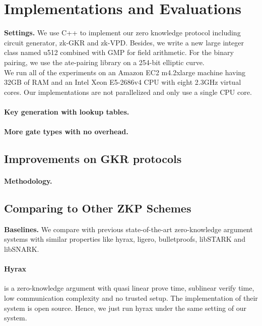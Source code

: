
\section{Implementations and Evaluations}\label{sec:eval}



\textbf{Settings.} We use C++ to implement our zero knowledge protocol including circuit generator, zk-GKR and zk-VPD. Besides, we write a new large integer class named u512 combined with GMP\cite{GNU} for field arithmetic. For the binary pairing, we use the ate-pairing\cite{ate-pairing} library on a 254-bit elliptic curve.\\
We run all of the experiments on an Amazon EC2 m4.2xlarge machine having 32GB of RAM and an Intel Xeon E5-2686v4 CPU with eight 2.3GHz virtual cores. Our implementations are not parallelized and only use a single CPU core.\\

\paragraph{Key generation with lookup tables.}

\paragraph{More gate types with no overhead.}

\subsection{Improvements on GKR protocols}\label{subsec:expGKR}
\paragraph{Methodology.}


\subsection{Comparing to Other ZKP Schemes}\label{subsec:expZKP}
\textbf{Baselines.} We compare \name{} with previous state-of-the-art zero-knowledge argument systems with similar properties like hyrax\cite{hyrax}, ligero\cite{ligero}, bulletproofs\cite{bulletproofs}, libSTARK\cite{libstark} and libSNARK\cite{libsnark}.\\
\paragraph{Hyrax} is a zero-knowledge argument with quasi linear prove time, sublinear verify time, low communication complexity and no trusted setup. The implementation of their system is open source. Hence, we just run hyrax under the same setting of our system.\\
